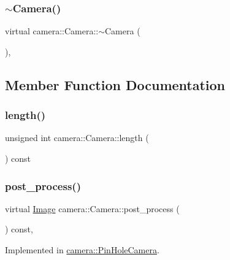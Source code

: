 \subsubsection{\texorpdfstring{$\sim$Camera()}{~Camera()}}
{\footnotesize\ttfamily virtual camera\+::\+Camera\+::$\sim$\+Camera (\begin{DoxyParamCaption}{ }\end{DoxyParamCaption})\hspace{0.3cm}{\ttfamily [virtual]}, {\ttfamily [default]}}



\subsection{Member Function Documentation}
\mbox{\label{classcamera_1_1Camera_a26d65b2bb9b5337cf586e8fb33c41127}} 
\subsubsection{\texorpdfstring{length()}{length()}}
{\footnotesize\ttfamily unsigned int camera\+::\+Camera\+::length (\begin{DoxyParamCaption}{ }\end{DoxyParamCaption}) const}

\mbox{\label{classcamera_1_1Camera_a56d942e3c4b51263bd7af3351da15d9f}} 
\subsubsection{\texorpdfstring{post\_process()}{post\_process()}}
{\footnotesize\ttfamily virtual \mbox{\hyperlink{namespacecamera_a7ac4fbfbf1f82c10ad94680fb8113483}{Image}} camera\+::\+Camera\+::post\+\_\+process (\begin{DoxyParamCaption}{ }\end{DoxyParamCaption}) const\hspace{0.3cm}{\ttfamily [protected]}, {}}



Implemented in \mbox{\hyperlink{classcamera_1_1PinHoleCamera_a1ed550429343036f2dd14a0aacbe2c27}{camera\+::\+Pin\+Hole\+Camera}}.

